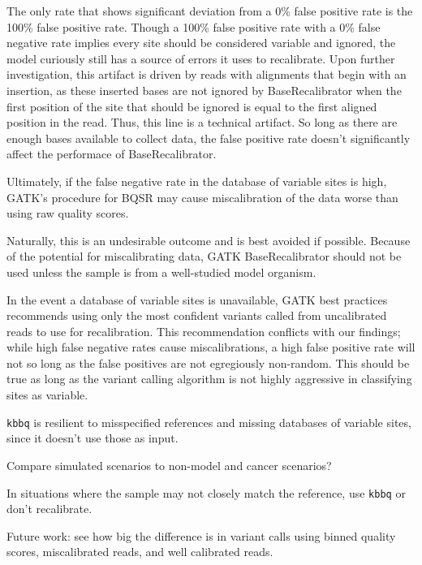 \documentclass{article}
\begin{document}
\begin{outline}
	\item The only rate that shows significant deviation from a 0\% false positive rate is the 100\% false positive rate. Though a 100\% false positive rate with a 0\% false negative rate implies every site should be considered variable and ignored, the model curiously still has a source of errors it uses to recalibrate. Upon further investigation, this artifact is driven by reads with alignments that begin with an insertion, as these inserted bases are not ignored by BaseRecalibrator when the first position of the site that should be ignored is equal to the first aligned position in the read. Thus, this line is a technical artifact. So long as there are enough bases available to collect data, the false positive rate doesn't significantly affect the performace of BaseRecalibrator.
	\item Ultimately, if the false negative rate in the database of variable sites is high, GATK's procedure for BQSR may cause miscalibration of the data worse than using raw quality scores. %
	\item Naturally, this is an undesirable outcome and is best avoided if possible. Because of the potential for miscalibrating data, GATK BaseRecalibrator should not be used unless the sample is from a well-studied model organism.
	\item In the event a database of variable sites is unavailable, GATK best practices recommends using only the most confident variants called from uncalibrated reads to use for recalibration. This recommendation conflicts with our findings; while high false negative rates cause miscalibrations, a high false positive rate will not so long as the false positives are not egregiously non-random. This should be true as long as the variant calling algorithm is not highly aggressive in classifying sites as variable. %
	\item \texttt{kbbq} is resilient to misspecified references and missing databases of variable sites, since it doesn't use those as input.
	\item Compare simulated scenarios to non-model and cancer scenarios?
	\begin{outline}
		\item In situations where the sample may not closely match the reference, use \texttt{kbbq} or don't recalibrate.
	\end{outline}
	\item Future work: see how big the difference is in variant calls using binned quality scores, miscalibrated reads, and well calibrated reads.
\end{outline}

\printbibliography
\end{document}
